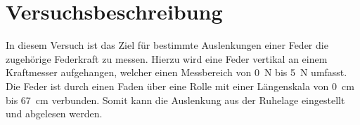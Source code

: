 \section{Versuchsbeschreibung}
\label{sec:Versuchsbeschreibung}

In diesem Versuch ist das Ziel für bestimmte Auslenkungen einer Feder die zugehörige Federkraft zu messen.
Hierzu wird eine Feder vertikal an einem Kraftmesser aufgehangen, welcher einen Messbereich von \SI{0}{\newton} bis \SI{5}{\newton} umfasst. 
Die Feder ist durch einen Faden über eine Rolle mit einer Längenskala von \SI{0}{\centi\meter} bis \SI{67}{\centi\meter} verbunden. Somit kann die Auslenkung aus der Ruhelage eingestellt und abgelesen werden.